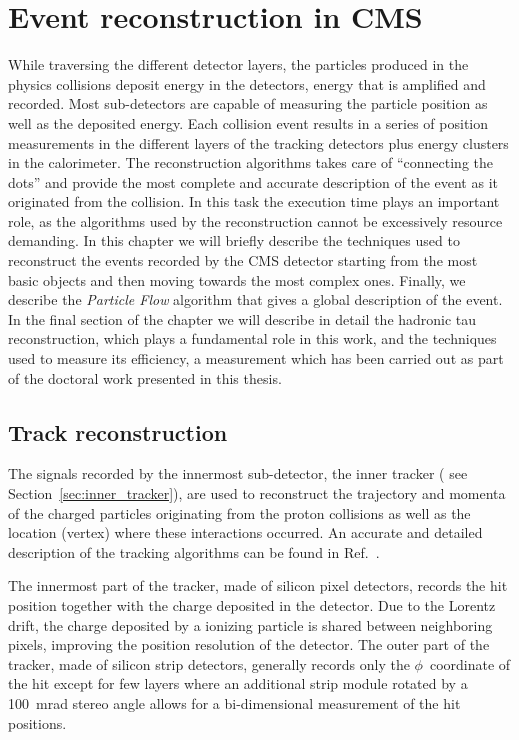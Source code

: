 \chapter{Event reconstruction in CMS}

While traversing the different detector layers, the particles produced in the physics collisions deposit energy in the detectors, energy that is amplified and recorded. Most sub-detectors are capable of measuring the particle position as well as the deposited energy. Each collision event results in a series of position measurements in the different layers of the tracking detectors plus energy clusters in the calorimeter. The reconstruction algorithms takes care of ``connecting the dots'' and provide the most complete and accurate description of the event as it originated from the collision. In this task the execution time plays an important role, as the algorithms used by the reconstruction cannot be excessively resource demanding. In this chapter we will briefly describe the techniques used to reconstruct the events recorded by the CMS detector starting from the most basic objects and then moving towards the most complex ones. Finally, we describe the \emph{Particle Flow} algorithm that gives a global description of the event. In the final section of the chapter we will describe in detail the hadronic tau reconstruction, which plays a fundamental role in this work, and the techniques used to measure its efficiency, a measurement which has been carried out as part of the doctoral work presented in this thesis.

\section{Track reconstruction}

The signals recorded by the innermost sub-detector, the inner tracker ( see Section~\ref{sec:inner_tracker}), are used to reconstruct the trajectory and momenta of the charged particles originating from the proton collisions as well as the location (vertex) where these interactions occurred. An accurate and detailed description of the tracking algorithms can be found in Ref.~\cite{cms_trk_11_01}.

The innermost part of the tracker, made of silicon pixel detectors, records the hit position together with the charge deposited in the detector. Due to the Lorentz drift, the charge deposited by a ionizing particle is shared between neighboring pixels, improving the position resolution of the detector. The outer part of the tracker, made of silicon strip detectors, generally records only the $\phi$\ coordinate of the hit except for few layers where an additional strip module rotated by a 100~mrad stereo angle allows for a bi-dimensional measurement of the hit positions.

